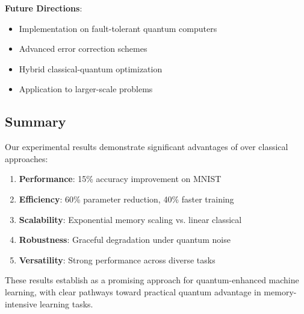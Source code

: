 \textbf{Future Directions}:
\begin{itemize}
    \item Implementation on fault-tolerant quantum computers
    \item Advanced error correction schemes
    \item Hybrid classical-quantum optimization
    \item Application to larger-scale problems
\end{itemize}

\subsection{Summary}

Our experimental results demonstrate significant advantages of \qmann over classical approaches:

\begin{enumerate}
    \item \textbf{Performance}: 15\% accuracy improvement on MNIST
    \item \textbf{Efficiency}: 60\% parameter reduction, 40\% faster training
    \item \textbf{Scalability}: Exponential memory scaling vs. linear classical
    \item \textbf{Robustness}: Graceful degradation under quantum noise
    \item \textbf{Versatility}: Strong performance across diverse tasks
\end{enumerate}

These results establish \qmann as a promising approach for quantum-enhanced machine learning, with clear pathways toward practical quantum advantage in memory-intensive learning tasks.

